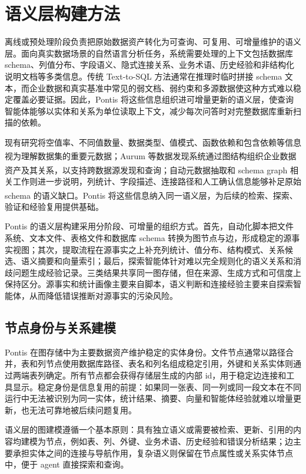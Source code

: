 \documentclass[
    bachelor,
    pdflinks,
]{xjtuthesis}
\newcommand{\upcite}[1]{\textsuperscript{\cite{#1}}}
\begin{document}
\chapter{语义层构建方法}

离线或预处理阶段负责把原始数据资产转化为可查询、可复用、可增量维护的语义层。面向真实数据场景的自然语言分析任务，系统需要处理的上下文包括数据库 schema、列值分布、字段语义、隐式连接关系、业务术语、历史经验和非结构化说明文档等多类信息。传统 Text-to-SQL 方法通常在推理时临时拼接 schema 文本，而企业数据和真实基准中常见的弱文档、弱约束和多源数据使这种方式难以稳定覆盖必要证据。因此，Pontis 将这些信息组织进可增量更新的语义层，使查询智能体能够以实体和关系为单位读取上下文，减少每次问答时对完整数据库重新扫描的依赖。

现有研究将空值率、不同值数量、数据类型、值模式、函数依赖和包含依赖等信息视为理解数据集的重要元数据\upcite{abedjan2015profiling}；Aurum 等数据发现系统通过图结构组织企业数据资产及其关系，以支持跨数据源发现和查询\upcite{fernandez2018aurum}；自动元数据抽取和 schema graph 相关工作则进一步说明，列统计、字段描述、连接路径和人工确认信息能够补足原始 schema 的语义缺口\upcite{shkapenyuk2025metadata,wang2025schemaGraphQA}。Pontis 将这些信息纳入同一语义层，为后续的检索、探索、验证和经验复用提供基础。

Pontis 的语义层构建采用分阶段、可增量的组织方式。首先，自动化脚本把文件系统、文本文件、表格文件和数据库 schema 转换为图节点与边，形成稳定的源事实视图；其次，提取流程在源事实之上补充列统计、值分布、结构模式、关系候选、语义摘要和向量索引；最后，探索智能体针对难以完全规则化的语义关系和消歧问题生成经验记录。三类结果共享同一图存储，但在来源、生成方式和可信度上保持区分。源事实和统计画像主要来自脚本，语义判断和连接经验主要来自探索智能体，从而降低错误推断对源事实的污染风险。

\section{节点身份与关系建模}

Pontis 在图存储中为主要数据资产维护稳定的实体身份。文件节点通常以路径合并，表和列节点使用数据库路径、表名和列名组成稳定引用，外键和关系实体则通过两端表列确定。所有节点都会获得存储层生成的内部 id，用于稳定边连接和工具显示。稳定身份是信息复用的前提：如果同一张表、同一列或同一段文本在不同运行中无法被识别为同一实体，统计结果、摘要、向量和智能体经验就难以增量更新，也无法可靠地被后续问题复用。

语义层的图建模遵循一个基本原则：具有独立语义或需要被检索、更新、引用的内容均建模为节点，例如表、列、外键、业务术语、历史经验和错误分析结果；边主要承担实体之间的连接与导航作用，复杂语义则保留在节点属性或关系实体节点中，便于 agent 直接探索和查询。
\end{document}
